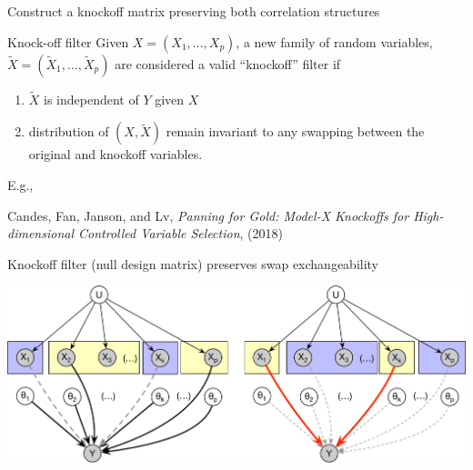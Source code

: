 \documentclass[
  ignorenonframetext,
  aspectratio=169]{beamer}
\begin{document}
\begin{frame}{Construct a knockoff matrix preserving both correlation
structures}
\protect\hypertarget{construct-a-knockoff-matrix-preserving-both-correlation-structures}{}
\begin{block}{Knock-off filter}
\protect\hypertarget{knock-off-filter}{}
Given \(X = (X_{1},\ldots, X_{p})\), a new family of random variables,
\(\tilde{X} = (\tilde{X}_{1},\ldots, \tilde{X}_{p})\) are considered a
valid ``knockoff'' filter if

\begin{enumerate}
\item
  \(\tilde{X}\) is independent of \(Y\) given \(X\)
\item
  distribution of \((X, \tilde{X})\) remain invariant to any swapping
  between the original and knockoff variables.
\end{enumerate}
\end{block}

E.g.,


\vfill

\tiny

Candes, Fan, Janson, and Lv, \emph{Panning for Gold: Model-X Knockoffs
for High-dimensional Controlled Variable Selection}, (2018)
\end{frame}

\begin{frame}{Knockoff filter (null design matrix) preserves swap
exchangeability}
\protect\hypertarget{knockoff-filter-null-design-matrix-preserves-swap-exchangeability}{}
\scriptsize

\begin{center}\includegraphics[width=.8\textwidth]{Vis/Knockoff6} \end{center}

\normalsize
\end{frame}
\end{document}
